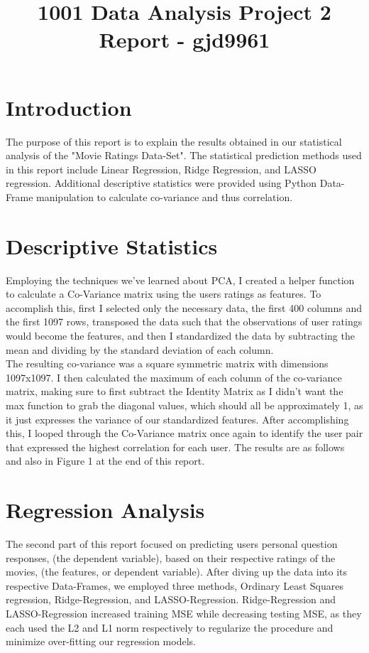 \documentclass[12pt,twoside]{article}
\title{1001 Data Analysis Project 2 Report - gjd9961}
\begin{document}
\maketitle

\section{Introduction}

The purpose of this report is to explain the results obtained in our statistical analysis of the "Movie Ratings Data-Set". The statistical prediction methods used in this report include Linear Regression, Ridge Regression, and LASSO regression. Additional descriptive statistics were provided using Python Data-Frame manipulation to calculate co-variance and thus correlation.

\section{Descriptive Statistics}

Employing the techniques we've learned about PCA, I created a helper function to calculate a Co-Variance matrix using the users ratings as features. To accomplish this, first I selected only the necessary data, the first 400 columns and the first 1097 rows, transposed the data such that the observations of user ratings would become the features, and then I standardized the data by subtracting the mean and dividing by the standard deviation of each column. \\

The resulting co-variance was a square symmetric matrix with dimensions 1097x1097. I then calculated the maximum of each column of the co-variance matrix, making sure to first subtract the Identity Matrix as I didn't want the max function to grab the diagonal values, which should all be approximately 1, as it just expresses the variance of our standardized features.
After accomplishing this, I looped through the Co-Variance matrix once again to identify the user pair that expressed the highest correlation for each user. The results are as follows and also in Figure 1 at the end of this report.

\section{Regression Analysis}
The second part of this report focused on predicting users personal question responses, (the dependent variable), based on their respective ratings of the movies, (the features, or dependent variable). After diving up the data into its respective Data-Frames, we employed three methods, Ordinary Least Squares regression, Ridge-Regression, and LASSO-Regression. Ridge-Regression and LASSO-Regression increased training MSE while decreasing testing MSE, as they each used the L2 and L1 norm respectively to regularize the procedure and minimize over-fitting our regression models. 
\end{document}
